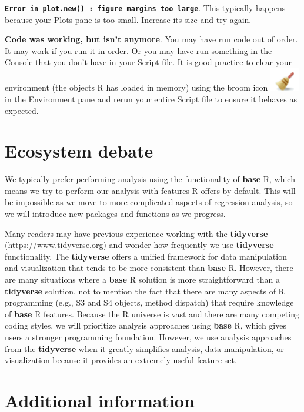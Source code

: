 \documentclass[
]{book}
\theoremstyle{definition}
\theoremstyle{definition}
\theoremstyle{definition}
\theoremstyle{definition}
\theoremstyle{remark}
\begin{document}
\textbf{\texttt{Error\ in\ plot.new()\ :\ figure\ margins\ too\ large}}. This typically happens because your Plots pane is too small. Increase its size and try again.

\textbf{Code was working, but isn't anymore}. You may have run code out of order. It may work if you run it in order. Or you may have run something in the Console that you don't have in your Script file. It is good practice to clear your environment (the objects R has loaded in memory) using the broom icon
\includegraphics[width=0.51in]{pictures/broom_button} in the Environment pane and rerun your entire Script file to ensure it behaves as expected.

\hypertarget{ecosystem-debate}{%
\section{Ecosystem debate}\label{ecosystem-debate}}

We typically prefer performing analysis using the functionality of \textbf{base} R, which means we try to perform our analysis with features R offers by default. This will be impossible as we move to more complicated aspects of regression analysis, so we will introduce new packages and functions as we progress.

Many readers may have previous experience working with the \textbf{tidyverse} (\url{https://www.tidyverse.org}) and wonder how frequently we use \textbf{tidyverse} functionality. The \textbf{tidyverse} offers a unified framework for data manipulation and visualization that tends to be more consistent than \textbf{base} R. However, there are many situations where a \textbf{base} R solution is more straightforward than a \textbf{tidyverse} solution, not to mention the fact that there are many aspects of R programming (e.g., S3 and S4 objects, method dispatch) that require knowledge of \textbf{base} R features. Because the R universe is vast and there are many competing coding styles, we will prioritize analysis approaches using \textbf{base} R, which gives users a stronger programming foundation. However, we use analysis approaches from the \textbf{tidyverse} when it greatly simplifies analysis, data manipulation, or visualization because it provides an extremely useful feature set.

\hypertarget{additional-information}{%
\section{Additional information}\label{additional-information}}
\end{document}
